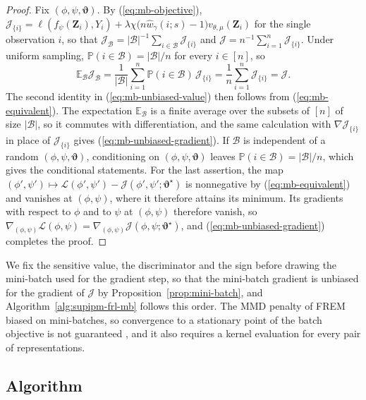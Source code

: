 \documentclass{article} %
\begin{document}
\begin{proof}
Fix $(\phi,\psi,\boldsymbol{\vartheta})$.  By (\ref{eq:mb-objective}), $\mathcal{J}_{\{i\}}=\ell(f_{\psi}(\mathbf{Z}_i),Y_i)+\lambda\chi\bigl(n\widehat{w}_{\gamma}(i;s)-1\bigr)v_{\theta,\mu}(\mathbf{Z}_i)$ for the single observation $i$, so that $\mathcal{J}_{\mathcal{B}}=|\mathcal{B}|^{-1}\sum_{i\in\mathcal{B}}\mathcal{J}_{\{i\}}$ and $\mathcal{J}=n^{-1}\sum_{i=1}^{n}\mathcal{J}_{\{i\}}$.  Under uniform sampling, $\mathbb{P}(i\in\mathcal{B})=|\mathcal{B}|/n$ for every $i\in[n]$, so
\[
  \mathbb{E}_{\mathcal{B}}\mathcal{J}_{\mathcal{B}}
  =\frac{1}{|\mathcal{B}|}\sum_{i=1}^{n}\mathbb{P}(i\in\mathcal{B})\,\mathcal{J}_{\{i\}}
  =\frac{1}{n}\sum_{i=1}^{n}\mathcal{J}_{\{i\}}
  =\mathcal{J}.
\]
The second identity in (\ref{eq:mb-unbiased-value}) then follows from (\ref{eq:mb-equivalent}).  The expectation $\mathbb{E}_{\mathcal{B}}$ is a finite average over the subsets of $[n]$ of size $|\mathcal{B}|$, so it commutes with differentiation, and the same calculation with $\nabla\mathcal{J}_{\{i\}}$ in place of $\mathcal{J}_{\{i\}}$ gives (\ref{eq:mb-unbiased-gradient}).  If $\mathcal{B}$ is independent of a random $(\phi,\psi,\boldsymbol{\vartheta})$, conditioning on $(\phi,\psi,\boldsymbol{\vartheta})$ leaves $\mathbb{P}(i\in\mathcal{B})=|\mathcal{B}|/n$, which gives the conditional statements.  For the last assertion, the map $(\phi',\psi')\mapsto\mathcal{L}(\phi',\psi')-\mathcal{J}(\phi',\psi';\boldsymbol{\vartheta}^{\star})$ is nonnegative by (\ref{eq:mb-equivalent}) and vanishes at $(\phi,\psi)$, where it therefore attains its minimum.  Its gradients with respect to $\phi$ and to $\psi$ at $(\phi,\psi)$ therefore vanish, so $\nabla_{(\phi,\psi)}\mathcal{L}(\phi,\psi)=\nabla_{(\phi,\psi)}\mathcal{J}(\phi,\psi;\boldsymbol{\vartheta}^{\star})$, and (\ref{eq:mb-unbiased-gradient}) completes the proof.
\end{proof}

We fix the sensitive value, the discriminator and the sign before drawing the mini-batch used for the gradient step, so that the mini-batch gradient is unbiased for the gradient of $\mathcal{J}$ by Proposition~\ref{prop:mini-batch}, and Algorithm~\ref{alg:supipm-frl-mb} follows this order.
The MMD penalty of FREM biased on mini-batches, so convergence to a stationary point of the batch objective is not guaranteed \citep{lee2026fair}, and it also requires a kernel evaluation for every pair of representations.


\subsection{Algorithm}
\label{app:algorithm-steps}
\end{document}
